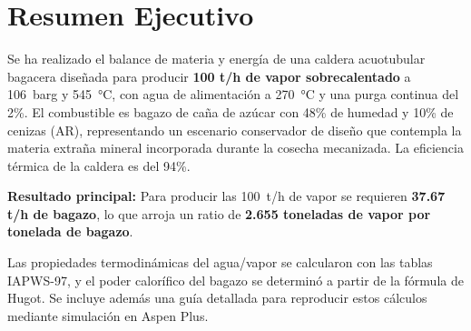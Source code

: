 \newpage
\section*{Resumen Ejecutivo}

Se ha realizado el balance de materia y energía de una caldera acuotubular bagacera diseñada para producir \textbf{100 t/h de vapor sobrecalentado} a \SI{106}{barg} y \SI{545}{\celsius}, con agua de alimentación a \SI{270}{\celsius} y una purga continua del 2\%. El combustible es bagazo de caña de azúcar con 48\% de humedad y 10\% de cenizas (AR), representando un escenario conservador de diseño que contempla la materia extraña mineral incorporada durante la cosecha mecanizada. La eficiencia térmica de la caldera es del 94\%.

\textbf{Resultado principal:} Para producir las 100~t/h de vapor se requieren \textbf{37.67 t/h de bagazo}, lo que arroja un ratio de \textbf{2.655 toneladas de vapor por tonelada de bagazo}.

Las propiedades termodinámicas del agua/vapor se calcularon con las tablas IAPWS-97, y el poder calorífico del bagazo se determinó a partir de la fórmula de Hugot. Se incluye además una guía detallada para reproducir estos cálculos mediante simulación en Aspen Plus.

\newpage
